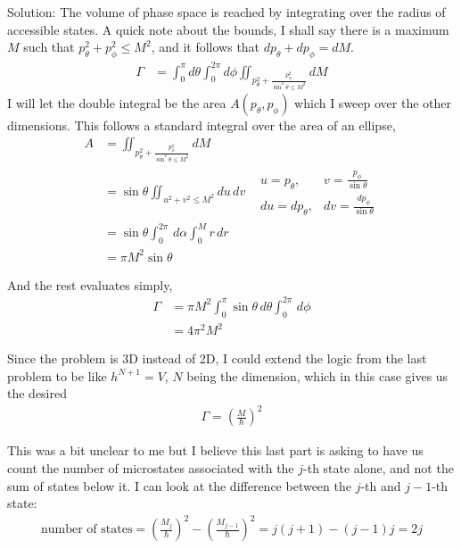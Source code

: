 \begin{homeworkProblem}
\begin{callout}{Solution:}
        The volume of phase space is reached by integrating over the radius of accessible states. A quick note about the bounds, I shall say there is a maximum $M$ such that $p_\theta^2 + p_\phi^2 \leq M^2$, and it follows that $dp_\theta + dp_\phi = dM$.
        \begin{align*}
            \Gamma &= \int_{0}^{\pi} d\theta \int_{0}^{2\pi} d\phi \iint_{p_\theta^{2} + \frac{p_\phi^{2}}{\sin^{2}\theta \leq M^{2}}} dM
        \end{align*}
        I will let the double integral be the area $A(p_\theta, p_\phi)$ which I sweep over the other dimensions. This follows a standard integral over the area of an ellipse,
        \begin{align*}
            A &= \iint_{p_\theta^{2} + \frac{p_\phi^{2}}{\sin^{2}\theta \leq M^{2}}} dM \\
              &= \sin\theta\iint_{u^{2} + v^{2}\leq M^{2}} du\,dv 
              &\begin{matrix} 
                  u=p_\theta, &v=\frac{p_\phi}{\sin\theta} \\
                  du=dp_\theta, &dv=\frac{dp_\phi}{\sin\theta} 
              \end{matrix} \\
              &= \sin \theta \int_{0}^{2\pi} \,d\alpha \int_{0}^{M} r\, dr \\
              &= \pi M^{2}\sin \theta 
        \end{align*}

        And the rest evaluates simply,
        \begin{align*}
            \Gamma &= \pi M^{2} \int_{0}^{\pi} \sin \theta \,d\theta \int_{0}^{2\pi}  \,d\phi \\
            &= 4\pi^{2}M^{2}
        \end{align*}

        Since the problem is 3D instead of 2D, I could extend the logic from the last problem to be like $h^{N+1}=V$, $N$ being the dimension, which in this case gives us the desired
        \begin{align*}
            \Gamma = \left( \frac{M}{\hbar} \right)^{2}
        \end{align*}

        This was a bit unclear to me but I believe this last part is asking to have us count the number of microstates associated with the $j$-th state alone, and not the sum of states below it. I can look at the difference between the $j$-th and $j-1$-th state:
        \begin{align*}
            \text{number of states} = \left(\frac{M_j}{\hbar}\right)^2 - \left(\frac{M_{j-1}}{\hbar}\right)^2 = j(j+1) - (j-1)j = 2j
        \end{align*}


\end{callout}
\end{homeworkProblem}
